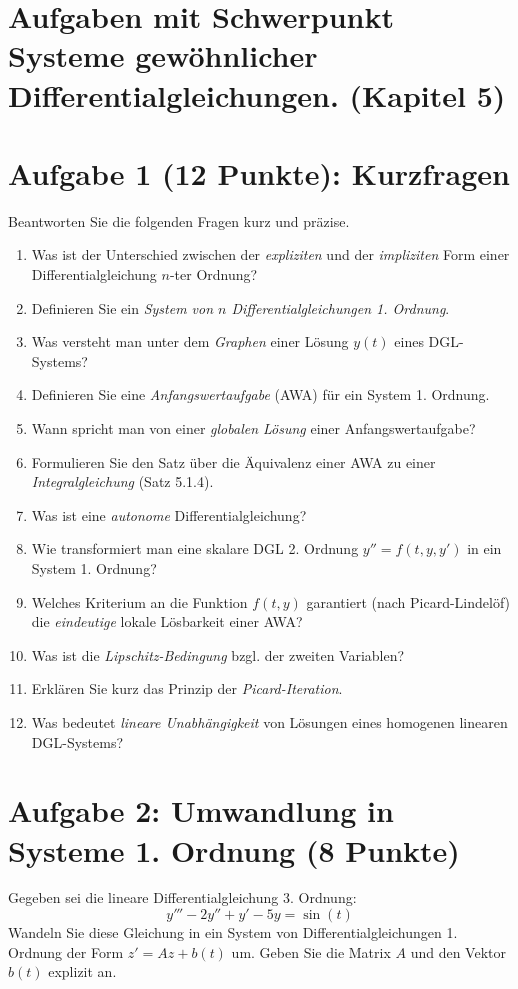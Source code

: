 \newpage
\section{Aufgaben mit Schwerpunkt Systeme gewöhnlicher Differentialgleichungen. (Kapitel 5)}

\section*{Aufgabe 1 (12 Punkte): Kurzfragen}
Beantworten Sie die folgenden Fragen kurz und präzise.

\begin{enumerate}
    \item Was ist der Unterschied zwischen der \textit{expliziten} und der \textit{impliziten} Form einer Differentialgleichung $n$-ter Ordnung?
    \item Definieren Sie ein \textit{System von $n$ Differentialgleichungen 1. Ordnung}.
    \item Was versteht man unter dem \textit{Graphen} einer Lösung $y(t)$ eines DGL-Systems?
    \item Definieren Sie eine \textit{Anfangswertaufgabe} (AWA) für ein System 1. Ordnung.
    \item Wann spricht man von einer \textit{globalen Lösung} einer Anfangswertaufgabe?
    \item Formulieren Sie den Satz über die Äquivalenz einer AWA zu einer \textit{Integralgleichung} (Satz 5.1.4).
    \item Was ist eine \textit{autonome} Differentialgleichung?
    \item Wie transformiert man eine skalare DGL 2. Ordnung $y'' = f(t, y, y')$ in ein System 1. Ordnung?
    \item Welches Kriterium an die Funktion $f(t, y)$ garantiert (nach Picard-Lindelöf) die \textit{eindeutige} lokale Lösbarkeit einer AWA?
    \item Was ist die \textit{Lipschitz-Bedingung} bzgl. der zweiten Variablen?
    \item Erklären Sie kurz das Prinzip der \textit{Picard-Iteration}.
    \item Was bedeutet \textit{lineare Unabhängigkeit} von Lösungen eines homogenen linearen DGL-Systems?
\end{enumerate}

\newpage

\section*{Aufgabe 2: Umwandlung in Systeme 1. Ordnung (8 Punkte)}
Gegeben sei die lineare Differentialgleichung 3. Ordnung:
\[ y''' - 2y'' + y' - 5y = \sin(t) \]
Wandeln Sie diese Gleichung in ein System von Differentialgleichungen 1. Ordnung der Form $z' = A z + b(t)$ um. Geben Sie die Matrix $A$ und den Vektor $b(t)$ explizit an.

